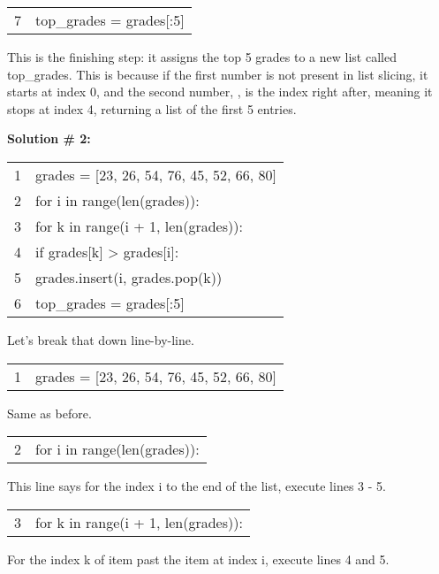 \documentclass{article}
\newcommand{\icode}[1]{{\ttfamily #1}}
\newenvironment{code}{\begin{tcolorbox}\ttfamily}{\end{tcolorbox}}
\begin{document}
\begin{code}
	\begin{tabular}{l|l}
		7& top\_grades = grades[:5]
	\end{tabular}
\end{code}
This is the finishing step: it assigns the top 5 grades to a new list called \icode{top\_grades}. This is because if the first number is not present in list slicing, it starts at index 0, and the second number, \icode{5}, is the index right after, meaning it stops at index 4, returning a list of the first 5 entries.

\newpage
\noindent\textbf{Solution \# 2:}

\begin{code}
	\begin{tabular}{l|l}
		1&grades = [23, 26, 54, 76, 45, 52, 66, 80]\\
		2&for i in range(len(grades)):\\
		3&\hspace{2 em}for k in range(i + 1, len(grades)):\\
		4&\hspace{4 em}if grades[k] > grades[i]:\\
		5& \hspace{6 em}grades.insert(i, grades.pop(k))\\
		6& top\_grades = grades[:5]
	\end{tabular}
\end{code}
\noindent Let's break that down line-by-line.
\vspace{.5 cm}

\begin{code}
	\begin{tabular}{l|l}
		1& grades = [23, 26, 54, 76, 45, 52, 66, 80]
	\end{tabular}
\end{code}
Same as before.

\begin{code}
	\begin{tabular}{l|l}
		2&for i in range(len(grades)):
	\end{tabular}
\end{code}
This line says for the index \icode{i} to the end of the list, execute lines 3 - 5.

\begin{code}
	\begin{tabular}{l|l}
		3&\hspace{2 em}for k in range(i + 1, len(grades)):
	\end{tabular}
\end{code}
For the index \icode{k} of item past the item at index \icode{i}, execute lines 4 and 5.
\end{document}
